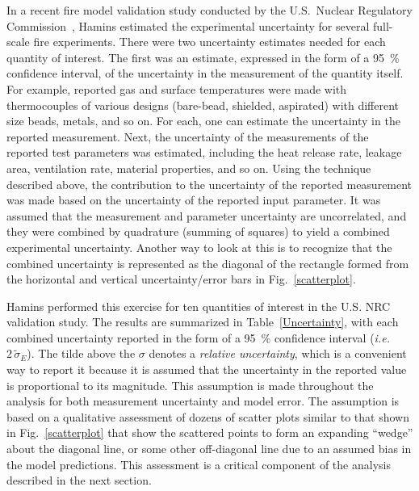 In a recent fire model validation study conducted by the U.S.~Nuclear Regulatory Commission~\cite{NUREG_1824},
Hamins estimated the experimental uncertainty for several full-scale fire experiments. There were
two uncertainty estimates needed for each quantity of interest. The first was an estimate, expressed in the
form of a 95~\% confidence interval, of the
uncertainty in the measurement of the quantity itself. For example, reported gas and surface temperatures
were made with thermocouples of various designs (bare-bead,
shielded, aspirated) with different size beads, metals, and so on. For each, one can estimate the
uncertainty in the reported measurement. Next, the
uncertainty of the measurements of the reported test parameters was estimated, including the heat release rate,
leakage area, ventilation rate, material
properties, and so on. Using the technique described above, the contribution to the uncertainty of the
reported measurement was made based on the uncertainty of the reported input parameter.
It was assumed that the measurement and parameter uncertainty are uncorrelated, and they were combined by
quadrature (summing of squares) to yield a combined
experimental uncertainty. Another way to look at this is to recognize that the combined uncertainty is
represented as the diagonal of the rectangle formed
from the horizontal and vertical uncertainty/error bars in Fig.~\ref{scatterplot}.

Hamins performed this exercise for ten quantities of interest in the U.S. NRC validation study.
The results are summarized in Table~\ref{Uncertainty}, with
each combined uncertainty reported in the form of a 95~\% confidence interval ({\em i.e.} $2 \, \widetilde{\sigma}_E$).
The tilde above the $\sigma$ denotes a
{\em relative uncertainty}, which is a convenient way to report it because it is assumed that the uncertainty in the
reported value is proportional to
its magnitude. This assumption is made throughout the analysis for both measurement uncertainty and model error.
The assumption is based on a
qualitative assessment of dozens of scatter plots similar to that shown in Fig.~\ref{scatterplot} that show
the scattered points to form an expanding ``wedge''
about the diagonal line, or some other off-diagonal line due to an assumed bias in the model predictions.
This assessment is a critical component of the
analysis described in the next section.

